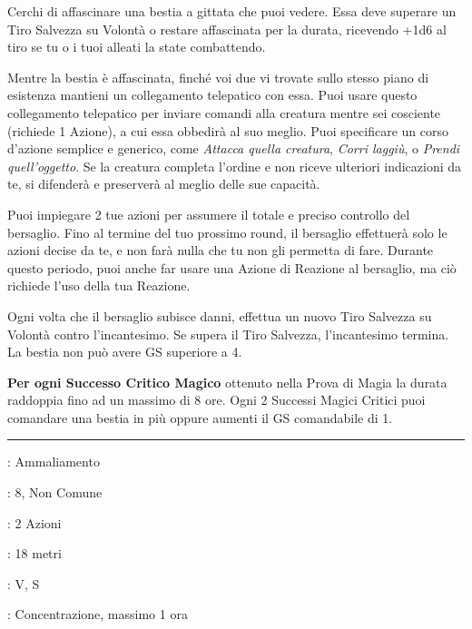 \begin{multicols}{2}
Cerchi di affascinare una bestia a gittata che puoi vedere. Essa deve superare un Tiro Salvezza su Volontà o restare affascinata per la durata, ricevendo +1d6 al tiro se tu o i tuoi alleati la state combattendo.

Mentre la bestia è affascinata, finché voi due vi trovate sullo stesso piano di esistenza mantieni un collegamento telepatico con essa. Puoi usare questo collegamento telepatico per inviare comandi alla creatura mentre sei cosciente (richiede 1 Azione), a cui essa obbedirà al suo meglio. Puoi specificare un corso d'azione semplice e generico, come \emph{Attacca quella creatura}, \emph{Corri laggiù}, o \emph{Prendi quell'oggetto}. Se la creatura completa l'ordine e non riceve ulteriori indicazioni da te, si difenderà e preserverà al meglio delle sue capacità.

Puoi impiegare 2 tue azioni per assumere il totale e preciso controllo del bersaglio. Fino al termine del tuo prossimo round, il bersaglio effettuerà solo le azioni decise da te, e non farà nulla che tu non gli permetta di fare. Durante questo periodo, puoi anche far usare una Azione di Reazione al bersaglio, ma ciò richiede l'uso della tua Reazione.

Ogni volta che il bersaglio subisce danni, effettua un nuovo Tiro Salvezza su Volontà contro l'incantesimo. Se supera il Tiro Salvezza, l'incantesimo termina. La bestia non può avere GS superiore a 4.

\textbf{Per ogni Successo Critico Magico} ottenuto nella Prova di Magia la durata raddoppia fino ad un massimo di 8 ore. Ogni 2 Successi Magici Critici puoi comandare una bestia in più oppure aumenti il GS comandabile di 1.

\smallskip\noindent\rule{\linewidth}{2pt} \hypertarget{Dominare Mostri}{}\smallskip{}
\noindent
\begin{description}[noitemsep, topsep=0pt, parsep=0pt, partopsep=0pt, leftmargin=0cm, labelwidth=2.8cm]
	\item[\textbf{Lista di Magia}]: Ammaliamento
	\item[\textbf{Livello}]: 8, Non Comune
	\item[\textbf{T. di Lancio}]: 2 Azioni
	\item[\textbf{Gittata}]: 18 metri
	\item[\textbf{Componenti}]: V, S
	\item[\textbf{Durata}]: Concentrazione, massimo 1 ora
\end{description}


\end{multicols}
